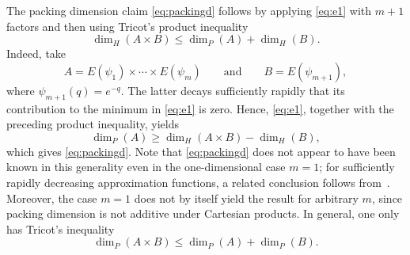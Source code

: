 \documentclass[11pt]{amsart}
\numberwithin{equation}{section}
\newcommand{\0}{\mathbf{0}}
\theoremstyle{remark}
\begin{document}


The packing dimension claim \eqref{eq:packingd} follows by applying
\eqref{eq:e1} with \(m+1\) factors and then using Tricot's product
inequality~\cite{Tricot1982}
\[
\dim_H(A\times B)\leq \dim_P(A)+\dim_H(B).
\]
Indeed, take
\[
A=E(\psi_1)\times\cdots\times E(\psi_m)
\qquad\text{and}\qquad
B=E(\psi_{m+1}),
\]
where \(\psi_{m+1}(q)=e^{-q}\). The latter decays sufficiently rapidly
that its contribution to the minimum in \eqref{eq:e1} is zero. Hence,
\eqref{eq:e1}, together with the preceding product inequality, yields
\[
\dim_P(A)
\geq
\dim_H(A\times B)-\dim_H(B),
\]
which gives \eqref{eq:packingd}.
Note that \eqref{eq:packingd} does not appear to have been known in
this generality even in the one-dimensional case \(m=1\); for sufficiently
rapidly decreasing approximation functions, a related conclusion follows
from~\cite[Corollary~7]{Joh2023RM}. Moreover, the case \(m=1\) does not by
itself yield the result for arbitrary \(m\), since packing dimension is not
additive under Cartesian products. In general, one only has Tricot's
inequality~\cite{Tricot1982}
\[
\dim_P(A\times B)\leq \dim_P(A)+\dim_P(B).
\]
\end{document}
